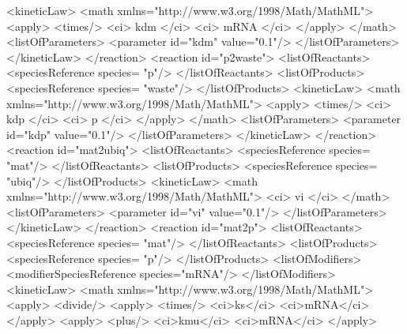 \documentclass{cekarticle}
\begin{document}
\begin{example}
            <kineticLaw>
                <math xmlns="http://www.w3.org/1998/Math/MathML">
                    <apply>
                        <times/>
                        <ci> kdm </ci>
                        <ci> mRNA </ci>
                    </apply>
                </math>
                <listOfParameters>
                    <parameter id="kdm" value="0.1"/>
                </listOfParameters>
            </kineticLaw>
        </reaction>
        <reaction id="p2waste">
            <listOfReactants>
                <speciesReference species= "p"/>
            </listOfReactants>
            <listOfProducts>
                <speciesReference species= "waste"/>
            </listOfProducts>
            <kineticLaw>
                <math xmlns="http://www.w3.org/1998/Math/MathML">
                    <apply>
                        <times/>
                        <ci> kdp </ci>
                        <ci> p </ci>
                    </apply>
                </math>
                <listOfParameters>
                    <parameter id="kdp" value="0.1"/>
                </listOfParameters>
            </kineticLaw>
        </reaction>
        <reaction id="mat2ubiq">
            <listOfReactants>
                <speciesReference species= "mat"/>
            </listOfReactants>
            <listOfProducts>
                <speciesReference species= "ubiq"/>
            </listOfProducts>
            <kineticLaw>
                <math xmlns="http://www.w3.org/1998/Math/MathML">
                    <ci> vi </ci>
                </math>
                <listOfParameters>
                    <parameter id="vi" value="0.1"/>
                </listOfParameters>
            </kineticLaw>
        </reaction>
        <reaction id="mat2p">
            <listOfReactants>
                <speciesReference species= "mat"/>
            </listOfReactants>
            <listOfProducts>
                <speciesReference species= "p"/>
            </listOfProducts>
            <listOfModifiers>
                <modifierSpeciesReference species="mRNA"/>
            </listOfModifiers>
            <kineticLaw>
                <math xmlns="http://www.w3.org/1998/Math/MathML">
                    <apply>
                        <divide/>
                        <apply>
                            <times/>
                            <ci>ks</ci>
                            <ci>mRNA</ci>    
                        </apply>
                        <apply>
                            <plus/>
                            <ci>kmu</ci>
                            <ci>mRNA</ci>
                        </apply>

\end{example}
\end{document}
